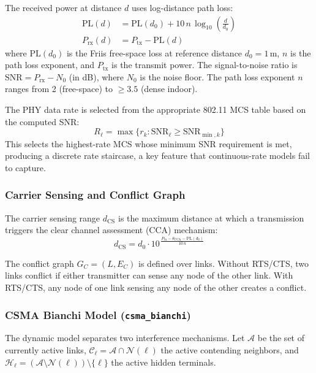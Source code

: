 \documentclass[conference]{IEEEtran}
\begin{document}
The received power at distance $d$ uses log-distance path loss:
\begin{align}
\text{PL}(d) &= \text{PL}(d_0) + 10\,n\,\log_{10}\!\left(\frac{d}{d_0}\right) \label{eq:pathloss} \\
P_\text{rx}(d) &= P_\text{tx} - \text{PL}(d) \label{eq:rxpower}
\end{align}
where $\text{PL}(d_0)$ is the Friis free-space loss at reference distance
$d_0 = 1$\,m, $n$ is the path loss exponent, and $P_\text{tx}$ is the
transmit power.  The signal-to-noise ratio is $\text{SNR} = P_\text{rx} - N_0$
(in dB), where $N_0$ is the noise floor.  The path loss exponent $n$ ranges from 2 (free-space) to $\geq 3.5$
(dense indoor).

The PHY data rate is selected from the appropriate 802.11 MCS table based
on the computed SNR:
\begin{equation}
R_\ell = \max\{r_k : \text{SNR}_\ell \geq \text{SNR}_{\min,k}\}
\label{eq:mcs}
\end{equation}
This selects the highest-rate MCS whose minimum SNR requirement is met,
producing a discrete rate staircase, a key feature that continuous-rate
models fail to capture.

\subsubsection{Carrier Sensing and Conflict Graph}

The carrier sensing range $d_\text{CS}$ is the maximum distance at which a
transmission triggers the clear channel assessment (CCA) mechanism:
\begin{equation}
d_\text{CS} = d_0 \cdot 10^{\,\frac{P_\text{tx} - \theta_\text{CCA} - \text{PL}(d_0)}{10\,n}}
\label{eq:csrange}
\end{equation}

The conflict graph $G_C = (L, E_C)$ is defined over links.  Without RTS/CTS,
two links conflict if either transmitter can sense any node of the other
link.  With RTS/CTS, any node of one link sensing any node of the other
creates a conflict.

\subsubsection{CSMA Bianchi Model (\texttt{csma\_bianchi})}
\label{sec:bianchi}

The dynamic model separates two interference mechanisms.  Let $\mathcal{A}$
be the set of currently active links, $\mathcal{C}_\ell = \mathcal{A} \cap
\mathcal{N}(\ell)$ the active contending neighbors, and $\mathcal{H}_\ell =
(\mathcal{A} \setminus \mathcal{N}(\ell)) \setminus \{\ell\}$ the active
hidden terminals.
\end{document}
